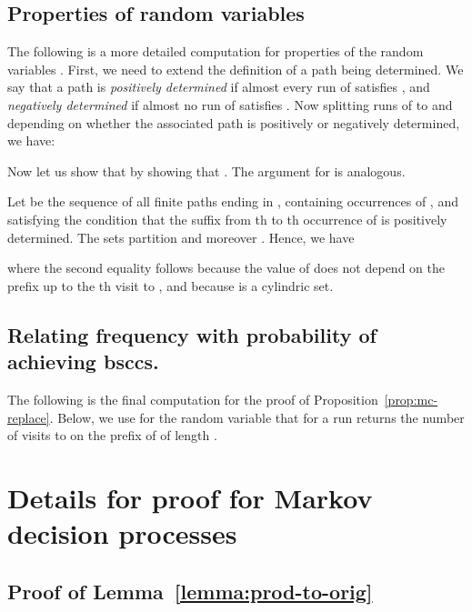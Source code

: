 \documentclass[a4paper,UKenglish]{lipics}
\begin{document}
\subsection{Properties of random variables }
\label{app:rv-xti}
The following is a more detailed computation for properties of the random variables . First, we need to extend the definition of a path being determined. We say that a path  is {\em positively determined} if almost every run of  satisfies , and {\em negatively determined} if almost no run of  satisfies . Now splitting runs of  to  and  depending on whether the associated path
is positively or negatively determined, we have:


Now let us show that  by showing that . The argument for  is analogous.

Let  be the sequence of all finite paths ending in , containing  occurrences of , and satisfying the condition that
the suffix from th to th occurrence of  is positively determined. The sets  partition  and moreover
. Hence, we have


where the second equality follows because the value of  does not depend on the prefix up to the th visit to , and because  is a cylindric set.
\subsection{Relating frequency with probability of achieving bsccs.}
\label{app:mc-bscc}
The following is the final computation for the proof of Proposition~\ref{prop:mc-replace}. Below, we use  for the random variable
that for a run  returns the number of visits to  on the prefix of  of length .
 




\section{Details for proof for Markov decision processes} \label{app:algorithm}

\subsection{Proof of Lemma~\ref{lemma:prod-to-orig}}
\end{document}
